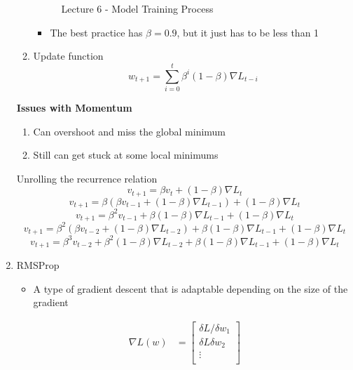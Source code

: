 \begin{enumerate}
\begin{enumerate}
\begin{figure}[ht]
    \caption{Lecture 6 - Model Training Process}
    \label{fig:data_split_extended}
\end{figure}
        \begin{itemize}
            \item The best practice has $\beta =0.9$, but it just has to be less than 1
        \end{itemize} 
        \item Update function
        \[
        w_{t+1} = \sum_{i=0}^{t} \beta^i(1-\beta)\nabla L_{t-i}
        \]
    \end{enumerate}
    \textbf{Issues with Momentum}
    \begin{enumerate}
        \item Can overshoot and miss the global minimum
        \item Still can get stuck at some local minimums
    \end{enumerate}
    Unrolling the recurrence relation
    \[
    v_{t+1} = \beta v_t+(1-\beta)\nabla L_t
    \]
    \[
    v_{t+1} = \beta (\beta v_{t-1} +(1-\beta)\nabla L_{t-1})+(1-\beta)\nabla L_t
    \]
    \[
    v_{t+1}=\beta^2v_{t-1}+\beta(1-\beta)\nabla L_{t-1} +(1-\beta)\nabla L_t
    \]
    \[
    v_{t+1}=\beta^2(\beta v_{t-2}+(1-\beta)\nabla L_{t-2})+\beta(1-\beta)\nabla L_{t-1}+(1-\beta)\nabla L_t
    \]
    \[
    v_{t+1}=\beta^3v_{t-2}+\beta^2(1-\beta)\nabla L_{t-2}+\beta(1-\beta)\nabla L_{t-1}+(1-\beta)\nabla L_t
    \]
    \item RMSProp
    \begin{itemize}
        \item A type of gradient descent that is adaptable depending on the size of the gradient
    \end{itemize}
    \begin{align*}
    \nabla L(w) &= \begin{bmatrix}
           \delta L/\delta w_1    \\
           \delta L\delta w_2    \\
           \vdots   \\

\end{bmatrix}
\end{align*}
\end{enumerate}
